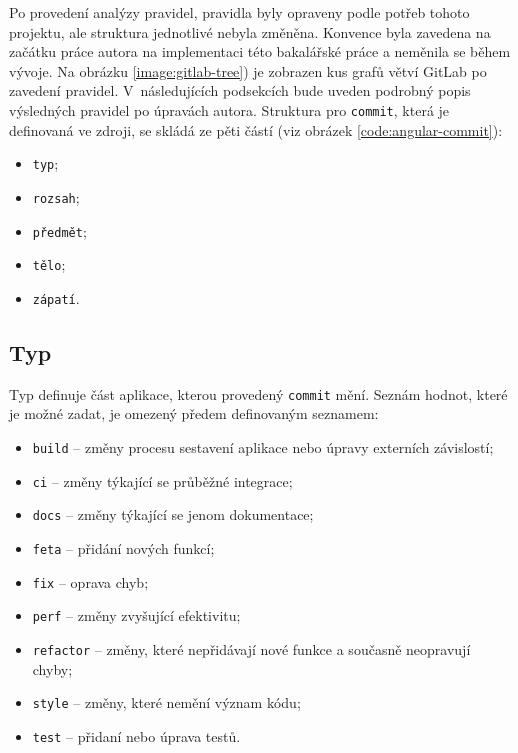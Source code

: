    Po provedení analýzy pravidel, pravidla byly opraveny podle potřeb tohoto projektu, ale struktura jednotlivé nebyla změněna. Konvence byla zavedena na začátku práce autora na implementaci této bakalářské práce a neměnila se během vývoje. Na obrázku \ref{image:gitlab-tree}) je zobrazen kus grafů větví GitLab po zavedení pravidel. V~následujících podsekcích bude uveden podrobný popis výsledných pravidel po úpravách autora. Struktura pro \verb|commit|, která je definovaná ve zdroji, se skládá ze pěti částí (viz obrázek \ref{code:angular-commit}):
    \begin{itemize}
    \setlength\itemsep{0.3em}
        \item \texttt{typ};
        \item \texttt{rozsah};
        \item \texttt{předmět};
        \item \texttt{tělo};
        \item \texttt{zápatí}.
    \end{itemize}
    
    \subsection{Typ}
        Typ definuje část aplikace, kterou provedený \verb|commit| mění. Seznám hodnot, které je možné zadat, je omezený předem definovaným seznamem:
        \begin{itemize}
        \setlength\itemsep{0.3em}
            \item \texttt{build} -- změny procesu sestavení aplikace nebo úpravy externích závislostí;
            \item \texttt{ci} -- změny týkající se průběžné integrace;
            \item \texttt{docs} -- změny týkající se jenom dokumentace;
            \item \texttt{feta} -- přidání nových funkcí;
            \item \texttt{fix} -- oprava chyb;
            \item \texttt{perf} -- změny zvyšující efektivitu;
            \item \texttt{refactor} -- změny, které nepřidávají nové funkce a současně neopravují chyby;
            \item \texttt{style} -- změny, které nemění význam kódu;
            \item \texttt{test} -- přidaní nebo úprava testů.
        \end{itemize}
    
